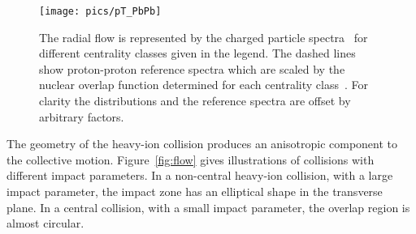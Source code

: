 





\begin{figure}[b!]
\centering
\texttt{[image: pics/pT\_PbPb]}
\caption[Charged particle spectra]{The radial flow is represented by the charged particle spectra~\cite{PRL106032301} for different centrality classes given in the legend. The dashed lines show  proton-proton reference spectra which are scaled by the nuclear overlap function determined for each centrality class~\cite{PRL106032301}.  For clarity the distributions and the reference spectra are offset by arbitrary factors.}
\label{fig:dndpt}
\end{figure}


The geometry of the heavy-ion collision produces an anisotropic component to the collective motion. Figure~\ref{fig:flow} gives illustrations of collisions with different impact parameters. In a non-central heavy-ion collision, with a large impact parameter, the impact zone has an elliptical shape in the transverse plane. In a central collision, with a small impact parameter, the overlap region is almost circular.

